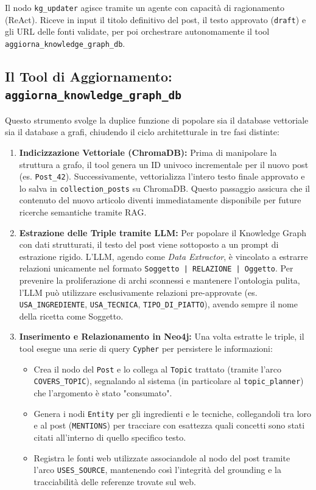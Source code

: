 \documentclass[11pt, a4paper]{article}
\begin{document}
Il nodo \texttt{kg\_updater} agisce tramite un agente con capacità di ragionamento (ReAct). Riceve in input il titolo definitivo del post, il testo approvato (\texttt{draft}) e gli URL delle fonti validate, per poi orchestrare autonomamente il tool \texttt{aggiorna\_knowledge\_graph\_db}.

\subsection{Il Tool di Aggiornamento: \texttt{aggiorna\_knowledge\_graph\_db}}

Questo strumento svolge la duplice funzione di popolare sia il database vettoriale sia il database a grafi, chiudendo il ciclo architetturale in tre fasi distinte:

\begin{enumerate}
    \item \textbf{Indicizzazione Vettoriale (ChromaDB):} Prima di manipolare la struttura a grafo, il tool genera un ID univoco incrementale per il nuovo post (es. \texttt{Post\_42}). Successivamente, vettorializza l'intero testo finale approvato e lo salva in \texttt{collection\_posts} su ChromaDB. Questo passaggio assicura che il contenuto del nuovo articolo diventi immediatamente disponibile per future ricerche semantiche tramite RAG.
    
    \item \textbf{Estrazione delle Triple tramite LLM:} Per popolare il Knowledge Graph con dati strutturati, il testo del post viene sottoposto a un prompt di estrazione rigido. L'LLM, agendo come \textit{Data Extractor}, è vincolato a estrarre relazioni unicamente nel formato \texttt{Soggetto | RELAZIONE | Oggetto}. Per prevenire la proliferazione di archi sconnessi e mantenere l'ontologia pulita, l'LLM può utilizzare esclusivamente relazioni pre-approvate (es. \texttt{USA\_INGREDIENTE}, \texttt{USA\_TECNICA}, \texttt{TIPO\_DI\_PIATTO}), avendo sempre il nome della ricetta come Soggetto.
    
    \item \textbf{Inserimento e Relazionamento in Neo4j:} Una volta estratte le triple, il tool esegue una serie di query \texttt{Cypher} per persistere le informazioni:
    \begin{itemize}
        \item Crea il nodo del \texttt{Post} e lo collega al \texttt{Topic} trattato (tramite l'arco \texttt{COVERS\_TOPIC}), segnalando al sistema (in particolare al \texttt{topic\_planner}) che l'argomento è stato "consumato".
        \item Genera i nodi \texttt{Entity} per gli ingredienti e le tecniche, collegandoli tra loro e al post (\texttt{MENTIONS}) per tracciare con esattezza quali concetti sono stati citati all'interno di quello specifico testo.
        \item Registra le fonti web utilizzate associandole al nodo del post tramite l'arco \texttt{USES\_SOURCE}, mantenendo così l'integrità del grounding e la tracciabilità delle referenze trovate sul web.
    \end{itemize}
\end{enumerate}
\end{document}

